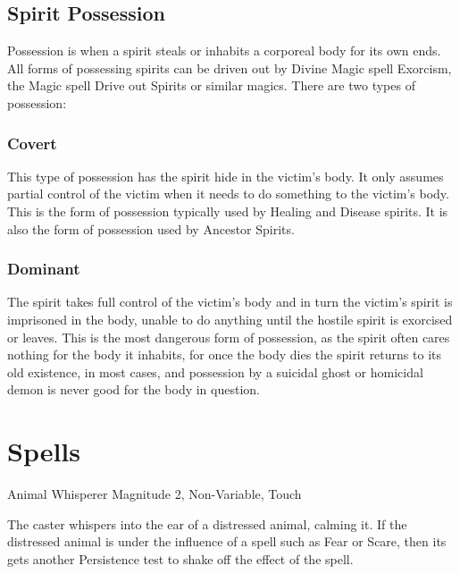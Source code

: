 \subsection{Spirit Possession}
Possession is when a spirit steals or inhabits a corporeal body for its own ends. All forms of possessing spirits can be driven out by Divine Magic spell Exorcism, the Magic spell Drive out Spirits or similar magics. There are two types of possession:

\subsubsection{Covert}
This type of possession has the spirit hide in the victim’s body. It only assumes partial control of the victim when it needs to do something to the victim’s body. This is the form of possession typically used by Healing and Disease spirits. It is also the form of possession used by Ancestor Spirits.

\subsubsection{Dominant}
The spirit takes full control of the victim’s body and in turn the victim’s spirit is imprisoned in the body, unable to do anything until the hostile spirit is exorcised or leaves. This is the most dangerous form of possession, as the spirit often cares nothing for the body it inhabits, for once the body dies the spirit returns to its old existence, in most cases, and possession by a suicidal ghost or homicidal demon is never good for the body in question.



\section{Spells}

\begin{rpg-spell}
{Animal Whisperer}
{Magnitude 2, Non-Variable, Touch}

The caster whispers into the ear of a distressed animal, calming it. If the distressed animal is under the influence of a spell such as Fear or Scare, then its gets another Persistence test to shake off the effect of the spell.
\end{rpg-spell}


%


